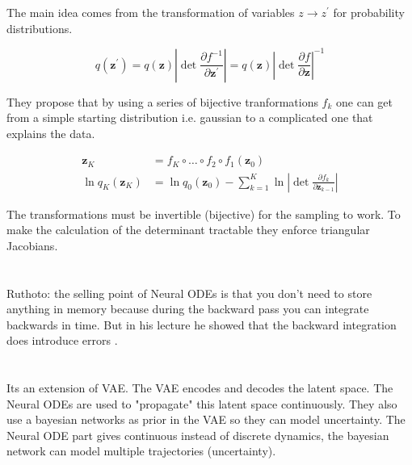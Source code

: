 \documentclass{article}
\newcommand{\citeall}[1]{\citeauthor{#1}}
\begin{document}
The main idea comes from the transformation of variables $z \rightarrow z^{\prime}$ for probability distributions.

\begin{equation}
q\left(\mathbf{z}^{\prime}\right)=q(\mathbf{z})\left|\operatorname{det} \frac{\partial f^{-1}}{\partial \mathbf{z}^{\prime}}\right|=q(\mathbf{z})\left|\operatorname{det} \frac{\partial f}{\partial \mathbf{z}}\right|^{-1}
\end{equation}

They propose that by using a series of bijective tranformations $f_k$ one can get from a simple starting distribution i.e. gaussian to a complicated one that explains the data.

\begin{equation}
\begin{aligned}
\mathbf{z}_{K} &=f_{K} \circ \ldots \circ f_{2} \circ f_{1}\left(\mathbf{z}_{0}\right) \\
\ln q_{K}\left(\mathbf{z}_{K}\right) &=\ln q_{0}\left(\mathbf{z}_{0}\right)-\sum_{k=1}^{K} \ln \left|\operatorname{det} \frac{\partial f_{k}}{\partial \mathbf{z}_{k-1}}\right|
\end{aligned}
\end{equation}

The transformations must be invertible (bijective) for the sampling to work. To make the calculation of the determinant tractable they enforce triangular Jacobians.

\section{\citeall{Chen2018NeuralEquations}}

Ruthoto: the selling point of Neural ODEs is that you don't need to store anything in memory because during the backward pass you can integrate backwards in time. But in his lecture he showed that the backward integration does introduce errors \cite{Ruthotto2019DeepEquations}.

\section{\citeall{Yldz2019ODE2VAE:Networks}}

Its an extension of VAE. The VAE encodes and decodes the latent space. The Neural ODEs are used to "propagate" this latent space continuously. They also use a bayesian networks as prior in the VAE so they can model uncertainty. The Neural ODE part gives continuous instead of discrete dynamics, the bayesian network can model multiple trajectories (uncertainty).
\end{document}
